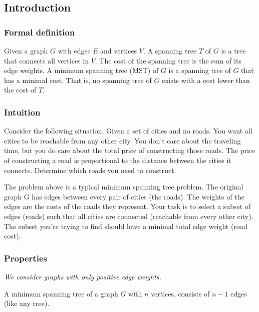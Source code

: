 \subsection{Introduction}
\subsubsection{Formal definition}
Given a graph $G$ with edges $E$ and vertices $V$.
A spanning tree $T$ of $G$ is a tree that connects all vertices in $V$. The cost of the spanning tree is the sum of its edge weights.
A minimum spanning tree (MST) of $G$ is a spanning tree of $G$ that has a minimal cost. That is, no spanning tree of $G$ exists with a cost lower than the cost of $T$.

\subsubsection{Intuition}
Consider the following situation:
Given a set of cities and no roads. You want all cities to be reachable from any other city. You don't care about the traveling time, but you do care about the total price of constructing those roads. The price of constructing a road is proportional to the distance between the cities it connects. Determine which roads you need to construct.

The problem above is a typical minimum spanning tree problem. The original graph G has edges between every pair of cities (the roads). The weights of the edges are the costs of the roads they represent. Your task is to select a subset of edges (roads) such that all cities are connected (reachable from every other city). The subset you're trying to find should have a minimal total edge weight (road cost).

\subsubsection{Properties}
\textit{We consider graphs with only positive edge weights.}

A minimum spanning tree of a graph $G$ with $n$ vertices, consists of $n-1$ edges (like any tree).
